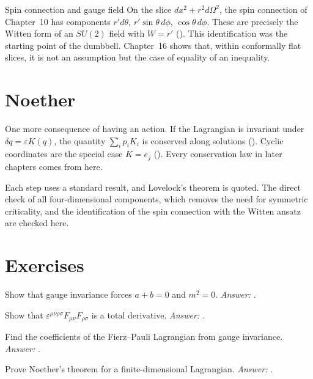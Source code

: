 \begin{asidebox}{Spin connection and gauge field}
On the slice $dx^2+r^2d\Omega^2$, the spin connection of Chapter~10 has components $r'd\theta$, $r'\sin\theta\,d\phi$, $\cos\theta\,d\phi$. These are precisely the Witten form of an $SU(2)$ field with $W=r'$ (). This identification was the starting point of the dumbbell. Chapter~16 shows that, within conformally flat slices, it is not an assumption but the case of equality of an inequality.
\end{asidebox}

\section{Noether}

One more consequence of having an action. If the Lagrangian is invariant under $\delta q=\varepsilon K(q)$, the quantity $\sum_ip_iK_i$ is conserved along solutions (). Cyclic coordinates are the special case $K=e_j$ (). Every conservation law in later chapters comes from here.

\begin{standsbox}
Each step uses a standard result, and Lovelock's theorem is quoted. The direct check of all four-dimensional components, which removes the need for symmetric criticality, and the identification of the spin connection with the Witten ansatz are checked here.
\end{standsbox}

\section*{Exercises}
\begin{exercise}Show that gauge invariance forces $a+b=0$ and $m^2=0$. \emph{Answer:} .\end{exercise}
\begin{exercise}Show that $\varepsilon^{\mu\nu\rho\sigma}F_{\mu\nu}F_{\rho\sigma}$ is a total derivative. \emph{Answer:} .\end{exercise}
\begin{exercise}Find the coefficients of the Fierz--Pauli Lagrangian from gauge invariance. \emph{Answer:} .\end{exercise}
\begin{exercise}Prove Noether's theorem for a finite-dimensional Lagrangian. \emph{Answer:} .\end{exercise}
